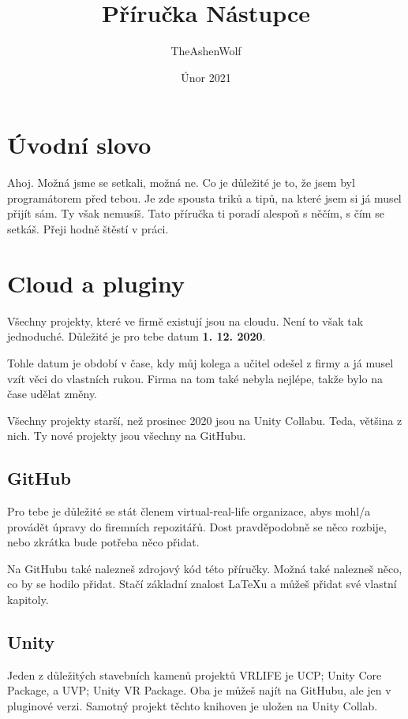 \documentclass{article}
\title{Příručka Nástupce}
\author{TheAshenWolf}
\date{Únor 2021}
\begin{document}
\clearpage\maketitle
\thispagestyle{empty}

\pagebreak

\renewcommand{\contentsname}{Obsah}
\tableofcontents

\pagebreak

\section{Úvodní slovo}
Ahoj. Možná jsme se setkali, možná ne. Co je důležité je to, že jsem byl programátorem před tebou. Je zde spousta triků a tipů, na které jsem si já musel přijít sám. Ty však nemusíš. Tato příručka ti poradí alespoň s něčím, s čím se setkáš. Přeji hodně štěstí v práci.
\pagebreak

\section{Cloud a pluginy}
Všechny projekty, které ve firmě existují jsou na cloudu. Není to však tak jednoduché. Důležité je pro tebe datum \textbf{1. 12. 2020}. 

Tohle datum je období v čase, kdy můj kolega a učitel odešel z firmy a já musel vzít věci do vlastních rukou. Firma na tom také nebyla nejlépe, takže bylo na čase udělat změny.

Všechny projekty starší, než prosinec 2020 jsou na Unity Collabu. Teda, většina z nich. Ty nové projekty jsou všechny na GitHubu. 

\subsection{GitHub}
Pro tebe je důležité se stát členem virtual-real-life organizace, abys mohl/a provádět úpravy do firemních repozitářů. Dost pravděpodobně se něco rozbije, nebo zkrátka bude potřeba něco přidat.

Na GitHubu také nalezneš zdrojový kód této příručky. Možná také nalezneš něco, co by se hodilo přidat.
Stačí základní znalost LaTeXu a můžeš přidat své vlastní kapitoly.

\subsection{Unity}
Jeden z důležitých stavebních kamenů projektů VRLIFE je UCP; Unity Core Package, a UVP; Unity VR Package. Oba je můžeš najít na GitHubu, ale jen v pluginové verzi. Samotný projekt těchto knihoven je uložen na Unity Collab.
\end{document}
